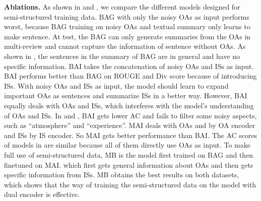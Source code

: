 \textbf{Ablations.}
As shown in  and ,
we compare the different models designed for semi-structured training data.
BAG with only the noisy OAs as input performs worst,
because BAG training on noisy OAs and textual summary only
learns to make sentence. At test, the BAG can only generate summaries
from the OAs in multi-review and cannot capture the information of sentence without OAs.
As shown in , the sentences in the summary of BAG 
are in general and have no specific information.
BAI 
takes the concatenation of noisy OAs and ISs as input.
BAI 
performs better than BAG on ROUGE and Div score 
because of introducing ISs.
With noisy OAs and ISs as input, the model should learn to expand important OAs as sentences and summarize ISs in a better way.
However, BAI equally deals with OAs and ISs,
which interferes with the model's understanding of OAs and ISs.
In  and ,
BAI gets lower AC and fails to filter some noisy aspects, such as ``atmosphere'' and ``experience''.
MAI deals with OAs and by OA encoder and ISs by IS encoder.
So MAI gets better performance than BAI.
The AC scores of models in  are similar
because all of them directly use OAs as input.
To make full use of semi-structured data,
MB is the model first trained on BAG and then finetuned on MAI.
which first gets general information about OAs and
then gets specific information from ISs.  
MB obtains the best results on both datasets, which shows
that the way of training the semi-structured data on 
the model with dual encoder is effective. %



